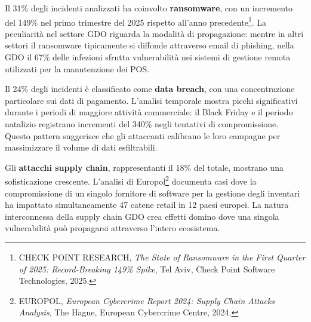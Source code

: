 Il 31\% degli incidenti analizzati ha coinvolto \textbf{ransomware}, con un incremento del 149\% nel primo trimestre del 2025 rispetto all'anno precedente\footnote{CHECK POINT RESEARCH, \textit{The State of Ransomware in the First Quarter of 2025: Record-Breaking 149\% Spike}, Tel Aviv, Check Point Software Technologies, 2025.}. La peculiarità nel settore GDO riguarda la modalità di propagazione: mentre in altri settori il ransomware tipicamente si diffonde attraverso email di phishing, nella GDO il 67\% delle infezioni sfrutta vulnerabilità nei sistemi di gestione remota utilizzati per la manutenzione dei POS.

Il 24\% degli incidenti è classificato come \textbf{data breach}, con una concentrazione particolare sui dati di pagamento. L'analisi temporale mostra picchi significativi durante i periodi di maggiore attività commerciale: il Black Friday e il periodo natalizio registrano incrementi del 340\% negli tentativi di compromissione. Questo pattern suggerisce che gli attaccanti calibrano le loro campagne per massimizzare il volume di dati esfiltrabili.

Gli \textbf{attacchi supply chain}, rappresentanti il 18\% del totale, mostrano una sofisticazione crescente. L'analisi di Europol\footnote{EUROPOL, \textit{European Cybercrime Report 2024: Supply Chain Attacks Analysis}, The Hague, European Cybercrime Centre, 2024.} documenta casi dove la compromissione di un singolo fornitore di software per la gestione degli inventari ha impattato simultaneamente 47 catene retail in 12 paesi europei. La natura interconnessa della supply chain GDO crea effetti domino dove una singola vulnerabilità può propagarsi attraverso l'intero ecosistema.


